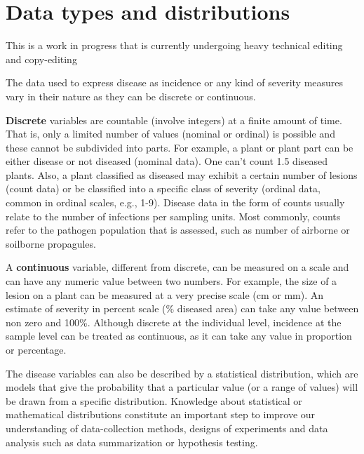 \documentclass[
  letterpaper,
  DIV=11,
  numbers=noendperiod]{scrreprt}
\begin{document}
\hypertarget{data-types-and-distributions}{%
\chapter{Data types and
distributions}\label{data-types-and-distributions}}

\begin{tcolorbox}[enhanced jigsaw, rightrule=.15mm, left=2mm, breakable, colframe=quarto-callout-note-color-frame, toprule=.15mm, leftrule=.75mm, bottomrule=.15mm, colback=white, arc=.35mm, opacityback=0]
\begin{minipage}[t]{5.5mm}
\textcolor{quarto-callout-note-color}{\faInfo}
\end{minipage}%
\begin{minipage}[t]{\textwidth - 5.5mm}
This is a work in progress that is currently undergoing heavy technical
editing and copy-editing\end{minipage}%
\end{tcolorbox}

The data used to express disease as incidence or any kind of severity
measures vary in their nature as they can be discrete or continuous.

\textbf{Discrete} variables are countable (involve integers) at a finite
amount of time. That is, only a limited number of values (nominal or
ordinal) is possible and these cannot be subdivided into parts. For
example, a plant or plant part can be either disease or not diseased
(nominal data). One can't count 1.5 diseased plants. Also, a plant
classified as diseased may exhibit a certain number of lesions (count
data) or be classified into a specific class of severity (ordinal data,
common in ordinal scales, e.g., 1-9). Disease data in the form of counts
usually relate to the number of infections per sampling units. Most
commonly, counts refer to the pathogen population that is assessed, such
as number of airborne or soilborne propagules.

A \textbf{continuous} variable, different from discrete, can be measured
on a scale and can have any numeric value between two numbers. For
example, the size of a lesion on a plant can be measured at a very
precise scale (cm or mm). An estimate of severity in percent scale (\%
diseased area) can take any value between non zero and 100\%. Although
discrete at the individual level, incidence at the sample level can be
treated as continuous, as it can take any value in proportion or
percentage.

The disease variables can also be described by a statistical
distribution, which are models that give the probability that a
particular value (or a range of values) will be drawn from a specific
distribution. Knowledge about statistical or mathematical distributions
constitute an important step to improve our understanding of
data-collection methods, designs of experiments and data analysis such
as data summarization or hypothesis testing.
\end{document}

